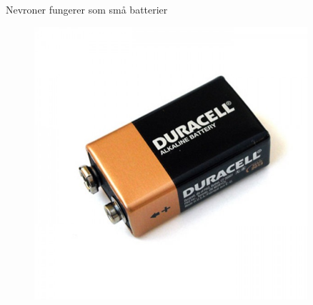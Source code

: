 \documentclass[presentation]{beamer}
\begin{document}
\begin{frame}{Nevroner fungerer som små batterier}
    \vspace{-0.5cm}
   \begin{figure}
       {\includegraphics[width=0.9\textwidth]{battery.jpg}}
\end{figure}
\end{frame}
\end{document}
